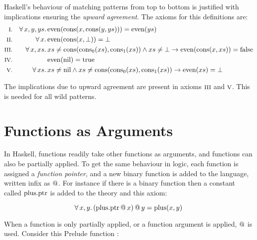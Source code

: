 Haskell's behaviour of matching patterns from top to bottom is
justified with implications ensuring the \emph{upward agreement}. The
axioms for this definitions are:
\newcommand\uncons[1]{\cons{\fn{cons_0}(#1)}{\fn{cons_1}(#1)}}
\newcommand\even[1]{\fn{even}(#1)}
\newcommand\cons[2]{\fn{cons}(#1,#2)}
\begin{align*}
\rom{1} && \faaa{x}{y}{ys} & \even{\cons{x}{\cons{y}{ys}}} = \even{ys} \\
\rom{2} && \fa{x}          & \even{\cons{x}{\bot}}         = \bot      \\
\rom{3} && \faa{x}{xs}     & xs \neq \uncons{xs} \wedge xs \neq \bot \rightarrow \even{\cons{x}{xs}} = \fn{false}  \\
\rom{4} &&                 & \even{\fn{nil}} = \fn{true} \\
\rom{5} && \fa{xs}         & xs \neq \fn{nil} \wedge
                             xs \neq \uncons{xs}
                             \rightarrow \even{xs} = \bot
\end{align*}

\begin{comment}
Some room for improvement can be seen: the inserted
\hs{even }$\bot$\hs{ = }$\bot$ case is redundant as it is implied by
the wild pattern to $\bot$.
\end{comment}

The implications due to upward agreement are present in axioms
$\romnodot{3}$ and $\romnodot{5}$. This is needed for all wild
patterns.

\section{Functions as Arguments}

In Haskell, functions readily take other functions as arguments, and
functions can also be partially applied. To get the same behaviour in
logic, each function is assigned a \emph{function pointer}, and a new
binary function is added to the language, written infix as $@$.
For instance if there is a binary function  then a constant
called $\mathrm{plus.ptr}$ is added to the theory and this axiom:

\begin{equation*}
\forall \, x , y . \,  (\mathrm{plus.ptr} \, @ \, x) \, @ \, y = \mathrm{plus}(x,y)
\end{equation*}

When a function is only partially applied, or a function argument is
applied, $@$ is used. Consider this Prelude function :

